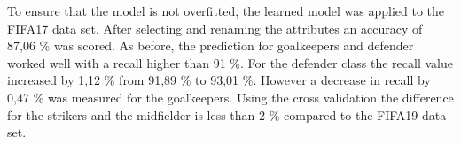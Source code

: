 To ensure that the model is not overfitted, the learned model was applied to the FIFA17 data set. After selecting and renaming the attributes an accuracy of 87,06 \% was scored.  %
As before, the prediction for goalkeepers and defender worked well with a recall higher than 91 \%. For the defender class the recall value increased by 1,12 \% from 91,89 \% to 93,01 \%. However a decrease in recall by 0,47 \% was measured for the goalkeepers.
Using the cross validation the difference for the strikers and the midfielder is less than 2 \% compared to the FIFA19 data set.



